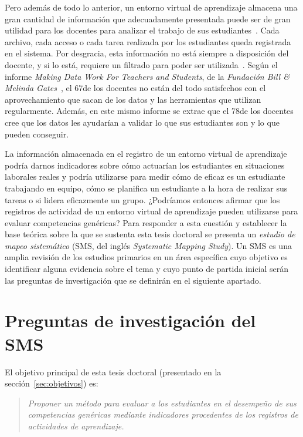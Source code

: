 Pero además de todo lo anterior, un entorno virtual de aprendizaje almacena una gran cantidad de información que adecuadamente presentada puede ser de gran utilidad para los docentes para analizar el trabajo de sus estudiantes~\cite{podgorelec:2011}. Cada archivo, cada acceso o cada tarea realizada por los estudiantes queda registrada en el sistema. Por desgracia, esta información no está siempre a disposición del docente, y si lo está, requiere un filtrado para poder ser utilizada~\cite{Chebil:2012}. Según el informe \emph{Making Data Work For Teachers and Students}, de la \emph{Fundación Bill \& Melinda Gates}~\cite{gates2015making}, el 67\percentage{ }de los docentes no están del todo satisfechos con el aprovechamiento que sacan de los datos y las herramientas que utilizan regularmente. Además, en este mismo informe se extrae que el 78\percentage{ }de los docentes cree que los datos les ayudarían a validar lo que sus estudiantes son y lo que pueden conseguir.   

La información almacenada en el registro de un entorno virtual de aprendizaje podría darnos indicadores sobre cómo actuarían los estudiantes en situaciones laborales reales y podría utilizarse para medir cómo de eficaz es un estudiante trabajando en equipo, cómo se planifica un estudiante a la hora de realizar sus tareas o si lidera eficazmente un grupo. ¿Podríamos entonces afirmar que los registros de actividad de un entorno virtual de aprendizaje pueden utilizarse para evaluar competencias genéricas? Para responder a esta cuestión y establecer la base teórica sobre la que se sustenta esta tesis doctoral se presenta un \emph{estudio de mapeo sistemático} (SMS, del inglés \emph{Systematic Mapping Study}). Un SMS es una amplia revisión de los estudios primarios en un área específica cuyo objetivo es identificar alguna evidencia sobre el tema y cuyo punto de partida inicial serán las preguntas de investigación que se definirán en el siguiente apartado.

\section{Preguntas de investigación del SMS}

El objetivo principal de esta tesis doctoral (presentado en la sección~\ref{sec:objetivos}) es:

\begin{quote}
\emph{Proponer un método para evaluar a los estudiantes en el desempeño de sus competencias genéricas mediante indicadores procedentes de los registros de actividades de aprendizaje.}
\end{quote}

